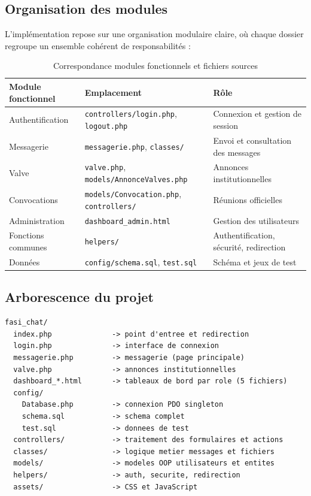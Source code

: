 \documentclass[12pt,a4paper]{article}
\begin{document}
\subsection{Organisation des modules}

L'implémentation repose sur une organisation modulaire claire, où chaque dossier regroupe un ensemble cohérent de responsabilités :

\begin{table}[h]
\centering
\small
\begin{tabular}{|l|l|l|}
\hline
\textbf{Module fonctionnel} & \textbf{Emplacement} & \textbf{Rôle} \\
\hline
Authentification & \texttt{controllers/login.php}, \texttt{logout.php} & Connexion et gestion de session \\
\hline
Messagerie & \texttt{messagerie.php}, \texttt{classes/} & Envoi et consultation des messages \\
\hline
Valve & \texttt{valve.php}, \texttt{models/AnnonceValves.php} & Annonces institutionnelles \\
\hline
Convocations & \texttt{models/Convocation.php}, \texttt{controllers/} & Réunions officielles \\
\hline
Administration & \texttt{dashboard\_admin.html} & Gestion des utilisateurs \\
\hline
Fonctions communes & \texttt{helpers/} & Authentification, sécurité, redirection \\
\hline
Données & \texttt{config/schema.sql}, \texttt{test.sql} & Schéma et jeux de test \\
\hline
\end{tabular}
\caption{Correspondance modules fonctionnels et fichiers sources}
\end{table}

\subsection{Arborescence du projet}

\begin{verbatim}
fasi_chat/
  index.php              -> point d'entree et redirection
  login.php              -> interface de connexion
  messagerie.php         -> messagerie (page principale)
  valve.php              -> annonces institutionnelles
  dashboard_*.html       -> tableaux de bord par role (5 fichiers)
  config/
    Database.php         -> connexion PDO singleton
    schema.sql           -> schema complet
    test.sql             -> donnees de test
  controllers/           -> traitement des formulaires et actions
  classes/               -> logique metier messages et fichiers
  models/                -> modeles OOP utilisateurs et entites
  helpers/               -> auth, securite, redirection
  assets/                -> CSS et JavaScript
\end{verbatim}
\end{document}
